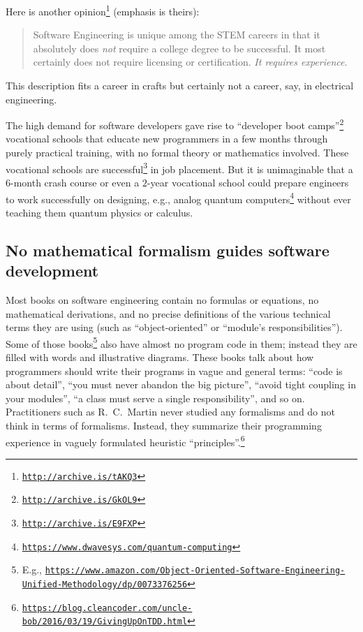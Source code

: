 Here is another opinion\footnote{\texttt{\href{http://archive.is/tAKQ3}{http://archive.is/tAKQ3}}}
(emphasis is theirs):
\begin{quotation}
{\small{}Software Engineering is unique among the STEM careers in
that it absolutely does }\emph{\small{}not}{\small{} require a college
degree to be successful. It most certainly does not require licensing
or certification. }\emph{\small{}It requires experience}{\small{}.}{\small\par}
\end{quotation}
This description fits a career in crafts \textemdash{} but certainly
not a career, say, in electrical engineering.

The high demand for software developers gave rise to \textsf{``}developer
boot camps\textsf{''}\footnote{\texttt{\href{http://archive.is/GkOL9}{http://archive.is/GkOL9}}}
\textemdash{} vocational schools that educate new programmers in a
few months through purely practical training, with no formal theory
or mathematics involved. These vocational schools are successful\footnote{\texttt{\href{http://archive.is/E9FXP}{http://archive.is/E9FXP}}}
in job placement. But it is unimaginable that a $6$-month crash course
or even a $2$-year vocational school could prepare engineers to work
successfully on designing, e.g., analog quantum computers\footnote{\texttt{\href{https://www.dwavesys.com/quantum-computing}{https://www.dwavesys.com/quantum-computing}}}
without ever teaching them quantum physics or calculus.

\subsection{No mathematical formalism guides software development}

Most books on software engineering contain no formulas or equations,
no mathematical derivations, and no precise definitions of the various
technical terms they are using (such as \textsf{``}object-oriented\textsf{''} or \textsf{``}module\textsf{'}s
responsibilities\textsf{''}). Some of those books\footnote{E.g., \texttt{\href{https://www.amazon.com/Object-Oriented-Software-Engineering-Unified-Methodology/dp/0073376256}{https://www.amazon.com/Object-Oriented-Software-Engineering-Unified-Methodology/dp/0073376256}}}
also have almost no program code in them; instead they are filled
with words and illustrative diagrams. These books talk about how programmers
should write their programs in vague and general terms: \textsf{``}code is
about detail\textsf{''}, \textsf{``}you must never abandon the big picture\textsf{''}, \textsf{``}avoid
tight coupling in your modules\textsf{''}, \textsf{``}a class must serve a single
responsibility\textsf{''}, and so on. Practitioners such as R.\ C.\ Martin
never studied any formalisms and do not think in terms of formalisms.
Instead, they summarize their programming experience in vaguely formulated
heuristic \textquotedblleft principles\textquotedblright .\footnote{\texttt{\href{https://blog.cleancoder.com/uncle-bob/2016/03/19/GivingUpOnTDD.html}{https://blog.cleancoder.com/uncle-bob/2016/03/19/GivingUpOnTDD.html}}}

